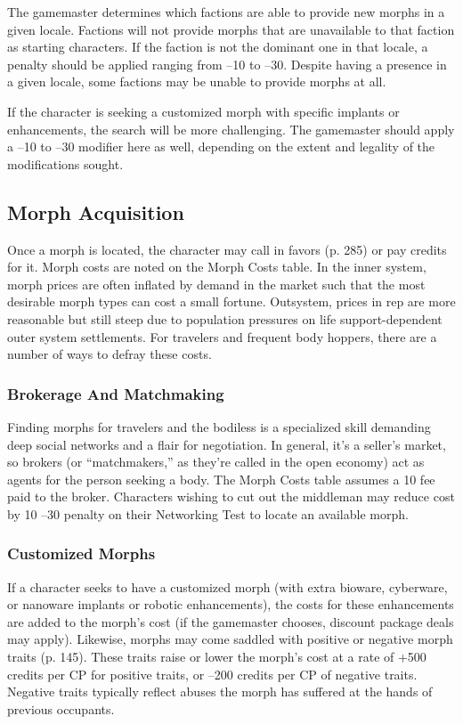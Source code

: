 The gamemaster determines which factions are able 
to provide new morphs in a given locale. Factions 
will not provide morphs that are unavailable to that 
faction as starting characters. If the faction is not the 
dominant one in that locale, a penalty should be applied
ranging from –10 to –30. Despite having a presence
in a given locale, some factions may be unable to
provide morphs at all.

If the character is seeking a customized morph with 
specific implants or enhancements, the search will be 
more challenging. The gamemaster should apply a –10 
to –30 modifier here as well, depending on the extent 
and legality of the modifications sought.

\subsection{Morph Acquisition}

Once a morph is located, the character may call in 
favors (p. 285) or pay credits for it. Morph costs are 
noted on the Morph Costs table. In the inner system, 
morph prices are often inflated by demand in the 
market such that the most desirable morph types can 
cost a small fortune. Outsystem, prices in rep are more 
reasonable but still steep due to population pressures 
on life support-dependent outer system settlements. 
For travelers and frequent body hoppers, there are a 
number of ways to defray these costs.

\subsubsection{Brokerage And Matchmaking}

Finding morphs for travelers and the bodiless is a 
specialized skill demanding deep social networks and 
a flair for negotiation. In general, it's a seller's market, 
so brokers (or ``matchmakers,'' as they're called in 
the open economy) act as agents for the person seeking
a body. The Morph Costs table assumes a 10%
fee paid to the broker. Characters wishing to cut out 
the middleman may reduce cost by 10%
–30 penalty on their Networking Test to locate an 
available morph.

\subsubsection{Customized Morphs}

If a character seeks to have a customized morph 
(with extra bioware, cyberware, or nanoware implants
or robotic enhancements), the costs for these
enhancements are added to the morph's cost (if the 
gamemaster chooses, discount package deals may 
apply). Likewise, morphs may come saddled with 
positive or negative morph traits (p. 145). These 
traits raise or lower the morph's cost at a rate of 
+500 credits per CP for positive traits, or –200 credits
per CP of negative traits. Negative traits typically
reflect abuses the morph has suffered at the hands of 
previous occupants.

